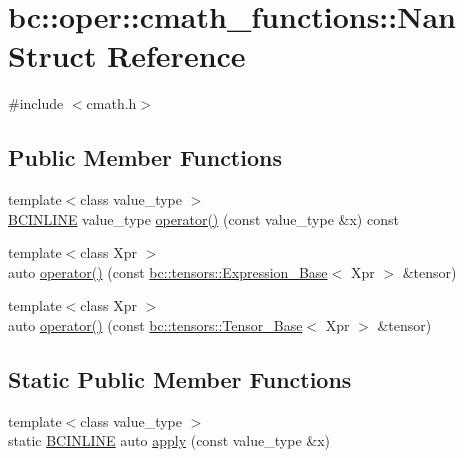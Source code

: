 \hypertarget{structbc_1_1oper_1_1cmath__functions_1_1Nan}{}\section{bc\+:\+:oper\+:\+:cmath\+\_\+functions\+:\+:Nan Struct Reference}
\label{structbc_1_1oper_1_1cmath__functions_1_1Nan}


{\ttfamily \#include $<$cmath.\+h$>$}

\subsection*{Public Member Functions}
\begin{DoxyCompactItemize}
\item 
{\footnotesize template$<$class value\+\_\+type $>$ }\\\hyperlink{common_8h_a6699e8b0449da5c0fafb878e59c1d4b1}{B\+C\+I\+N\+L\+I\+NE} value\+\_\+type \hyperlink{structbc_1_1oper_1_1cmath__functions_1_1Nan_a7679125e1815040c8d037d1c2ae3adad}{operator()} (const value\+\_\+type \&x) const
\item 
{\footnotesize template$<$class Xpr $>$ }\\auto \hyperlink{structbc_1_1oper_1_1cmath__functions_1_1Nan_a662d1e5841e0d6d1da990d5fb4ab940d}{operator()} (const \hyperlink{classbc_1_1tensors_1_1Expression__Base}{bc\+::tensors\+::\+Expression\+\_\+\+Base}$<$ Xpr $>$ \&tensor)
\item 
{\footnotesize template$<$class Xpr $>$ }\\auto \hyperlink{structbc_1_1oper_1_1cmath__functions_1_1Nan_af685e0d0bbc39677f193ed9b6dda10db}{operator()} (const \hyperlink{classbc_1_1tensors_1_1Tensor__Base}{bc\+::tensors\+::\+Tensor\+\_\+\+Base}$<$ Xpr $>$ \&tensor)
\end{DoxyCompactItemize}
\subsection*{Static Public Member Functions}
\begin{DoxyCompactItemize}
\item 
{\footnotesize template$<$class value\+\_\+type $>$ }\\static \hyperlink{common_8h_a6699e8b0449da5c0fafb878e59c1d4b1}{B\+C\+I\+N\+L\+I\+NE} auto \hyperlink{structbc_1_1oper_1_1cmath__functions_1_1Nan_a4bf94c55b7a6b3a77b5d08d5abee00b1}{apply} (const value\+\_\+type \&x)
\end{DoxyCompactItemize}



